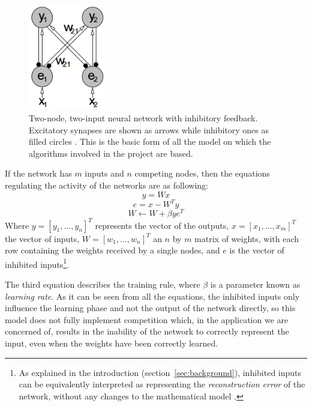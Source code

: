 \documentclass[11pt,a4paper]{report}
\begin{document}
			\newpage

			\begin{figure}[h]
				\centering
				\includegraphics[width=0.3\textwidth]{basictopology}
				\caption{Two-node, two-input neural network with inhibitory feedback. Excitatory synapses are shown as arrows while inhibitory ones as filled circles \cite{spratling2009unsupervised}. This is the basic form of all the model on which the algorithms involved in the project are based.}
				\label{fig:basictopology}
			\end{figure}

			If the network has $m$ inputs and $n$ competing nodes, then the equations regulating the activity of the networks are as following:
			\begin{equation}
				y = Wx
			\end{equation}
			\begin{equation}
				e = x - W^Ty
			\end{equation}
			\begin{equation}
				W \leftarrow W + \beta y e^T
			\end{equation}
			Where $y = [y_1, ..., y_n]^T$ represents the vector of the outputs, $x = [x_1, ..., x_m]^T$ the vector of inputs, $W = [w_1, ..., w_n]^T$ an $n$ by $m$ matrix of weights, with each row containing the weights received by a single nodes, and $e$ is the vector of inhibited inputs\footnote{As explained in the introduction (section~\ref{sec:background}), inhibited inputs can be equivalently interpreted as representing the \emph{reconstruction error} of the network, without any changes to the mathematical model \cite{spratling2009unsupervised}.}.
			
			The third equation describes the training rule, where $\beta$ is a parameter known as \emph{learning rate}. As it can be seen from all the equations, the inhibited inputs only influence the learning phase and not the output of the network directly, so this model does not fully implement competition which, in the application we are concerned of, results in the inability of the network to correctly represent the input, even when the weights have been correctly learned.
				
\end{document}
